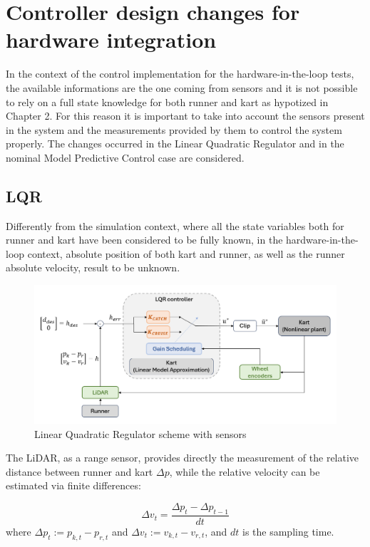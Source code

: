 \documentclass[a4paper,12pt,oneside]{book}
\begin{document}
\newpage
\section{Controller design changes for hardware integration}
In the context of the control implementation for the hardware-in-the-loop tests, the available informations are the one coming from sensors and it is not possible to rely on a full state knowledge for both runner and kart as hypotized in Chapter 2.
For this reason it is important to take into account the sensors present in the system and the measurements provided by them to control the system properly. 
The changes occurred in the Linear Quadratic Regulator and in the nominal Model Predictive Control case are considered.

\subsection*{LQR}
Differently from the simulation context, where all the state variables both for runner and kart have been considered to be fully known, in the hardware-in-the-loop context, absolute position of both kart and runner, as well as the runner absolute velocity, result to be unknown.

\begin{figure} [h!]
	\centering
	\includegraphics[width=1.0\textwidth]{LQR_hard_scheme.png}
	\caption{Linear Quadratic Regulator scheme with sensors}
	\label{image:LQR_hard_scheme}
\end{figure}

The LiDAR, as a range sensor, provides directly the measurement of the relative distance between runner and kart $\Delta p$, while the relative velocity can be estimated via finite differences:

\begin{equation}
	\Delta v_t = \frac{\Delta p_t - \Delta p_{t-1}} {dt}
\end{equation}
where $\Delta p_t := p_{k,t} - p_{r,t}$ and $\Delta v_t := v_{k,t} - v_ {r,t}$, and $dt$ is the sampling time.
\end{document}
